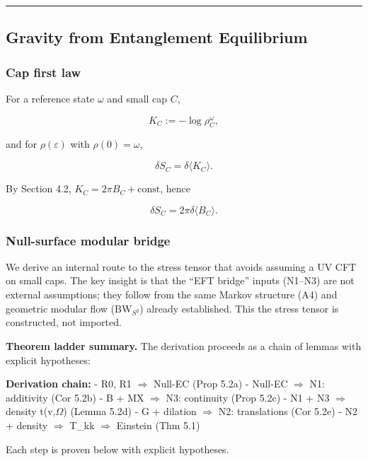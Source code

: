\documentclass[11pt,a4paper]{article}
\theoremstyle{remark}
\begin{document}
\begin{center}\rule{0.5\linewidth}{0.5pt}\end{center}

\subsection{Gravity from Entanglement Equilibrium}\label{gravity-from-entanglement-equilibrium}

\subsubsection{Cap first law}\label{cap-first-law}

For a reference state \(\omega\) and small cap \(C\),

\[
K_C := -\log \rho_C^{\omega},
\]

and for \(\rho(\varepsilon)\) with \(\rho(0)=\omega\),

\[
\delta S_C = \delta \langle K_C \rangle.
\]

By Section 4.2, \(K_C = 2\pi B_C + \text{const}\), hence

\[
\delta S_C = 2 \pi \delta \langle B_C \rangle.
\]

\subsubsection{Null-surface modular bridge}\label{null-surface-modular-bridge}

We derive an internal route to the stress tensor that avoids assuming a UV
CFT on small caps. The key insight is that the ``EFT bridge'' inputs (N1--N3)
are not external assumptions; they follow from the same Markov structure
(A4) and geometric modular flow (BW\(_{S^2}\)) already established. This
the stress tensor is constructed, not imported.

\textbf{Theorem ladder summary.} The derivation proceeds as a chain of lemmas with
explicit hypotheses:

\textbf{Derivation chain:}
- R0, R1 \ensuremath{\Longrightarrow} Null-EC (Prop 5.2a)
- Null-EC \ensuremath{\Longrightarrow} N1: additivity (Cor 5.2b)
- B + MX \ensuremath{\Longrightarrow} N3: continuity (Prop 5.2c)
- N1 + N3 \ensuremath{\Longrightarrow} density t(v,\ensuremath{\Omega}) (Lemma 5.2d)
- G + dilation \ensuremath{\Longrightarrow} N2: translations (Cor 5.2e)
- N2 + density \ensuremath{\Longrightarrow} T\_kk \ensuremath{\Longrightarrow} Einstein (Thm 5.1)

Each step is proven below with explicit hypotheses.
\end{document}
